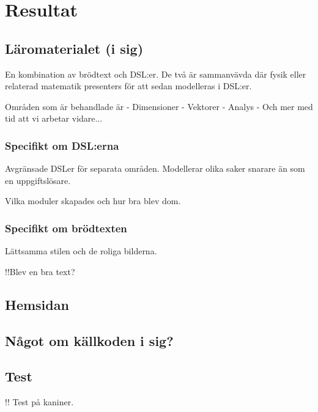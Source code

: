 
\chapter{Resultat}

\begin{binge}


\section{Läromaterialet (i sig)}

En kombination av brödtext och DSL:er. De två är sammanvävda där fysik eller relaterad matematik presenters för att sedan modelleras i DSL:er.

Områden som är behandlade är 
- Dimensioner
- Vektorer
- Analys
- Och mer med tid att vi arbetar vidare...

\subsection{Specifikt om DSL:erna}

Avgränsade DSLer för separata områden. Modellerar olika saker snarare än som en uppgiftslösare.

Vilka moduler skapades och hur bra blev dom.

\subsection{Specifikt om brödtexten}

Lättsamma stilen och de roliga bilderna.

!!Blev en bra text?

\section{Hemsidan}

\section{Något om källkoden i sig?}

\section{Test}

!! Test på kaniner.

\end{binge}
